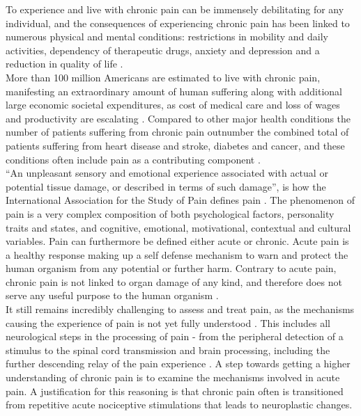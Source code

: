 To experience and live with chronic pain can be immensely debilitating for any individual, and the consequences of experiencing chronic pain has been linked to numerous physical and mental conditions: restrictions in mobility and daily activities, dependency of therapeutic drugs, anxiety and depression and a reduction in quality of life \cite{Dahlhamer2018,NationalCenterforHealthStatisticsHealth2011}. \\ More than 100 million Americans are estimated to live with chronic pain, manifesting an extraordinary amount of human suffering along with additional large economic societal expenditures, as cost of medical care and loss of wages and productivity are escalating  \cite{InstituteofMedicine2011,Davis2017}. Compared to other major health conditions the number of patients suffering from chronic pain outnumber the combined total of patients suffering from heart disease and stroke, diabetes and cancer, and these conditions often include pain as a contributing component \cite{NationalCenterforHealthStatisticsHealth2011}. \\
“An unpleasant sensory and emotional experience associated with actual or potential tissue damage, or described in terms of such damage”, is how the International Association for the Study of Pain defines pain \cite{Merskey1994}. The phenomenon of pain is a very complex composition of both psychological factors, personality traits and states, and cognitive, emotional, motivational, contextual and cultural variables. Pain can furthermore be defined either acute or chronic. Acute pain is a healthy response making up a self defense mechanism to warn and protect the human organism from any potential or further harm. \cite{Brook2011,Garland2013,Davis2017} Contrary to acute pain, chronic pain is not linked to organ damage of any kind, and therefore does not serve any useful purpose to the human organism \cite{Schmidt1986}. \\
It still remains incredibly challenging to assess and treat pain, as the mechanisms causing the experience of pain is not yet fully understood \cite{Nielsen2008,Coghill2011}. This includes all neurological steps in the processing of pain - from the peripheral detection of a stimulus to the spinal cord transmission and brain processing, including the further descending relay of the pain experience \cite{Feizerfan2015}. A step towards getting a higher understanding of chronic pain is to examine the mechanisms involved in acute pain. A justification for this reasoning is that chronic pain often is transitioned from repetitive acute nociceptive stimulations that leads to neuroplastic changes. \cite{Feizerfan2015, Mcgreevy2012}\\
